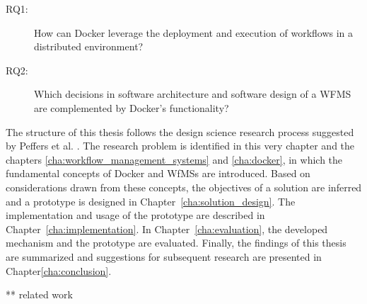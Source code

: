 \begin{description}
  \item[RQ1:] How can Docker leverage the deployment and execution of workflows in a distributed environment?
  \item[RQ2:] Which decisions in software architecture and software design of a WFMS are complemented by Docker's functionality?
\end{description}

The structure of this thesis follows the design science research process suggested by Peffers et al. \cite[pp.~89-92]{Peffers2007Design}. The research problem is identified in this very chapter and the chapters \ref{cha:workflow_management_systems} and \ref{cha:docker}, in which the fundamental concepts of Docker and \acp{WfMS} are introduced.
Based on considerations drawn from these concepts, the objectives of a solution are inferred and a prototype is designed in Chapter~\ref{cha:solution_design}. The implementation and usage of the prototype are described in Chapter~\ref{cha:implementation}. In Chapter~\ref{cha:evaluation}, the developed mechanism and the prototype are evaluated. Finally, the findings of this thesis are summarized and suggestions for subsequent research are presented in Chapter\ref{cha:conclusion}.

** related work
